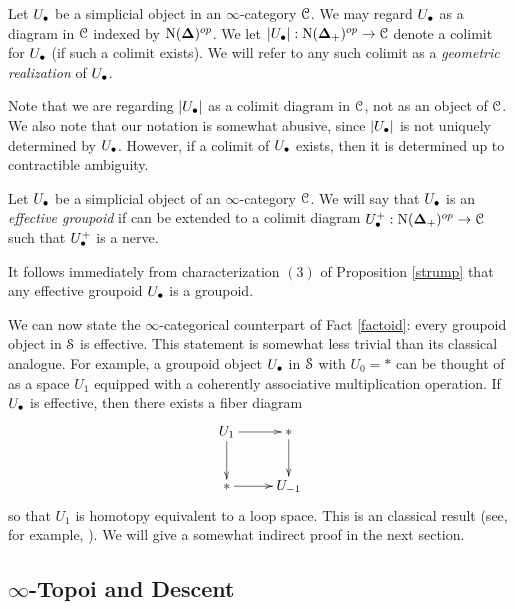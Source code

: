 \begin{notation}
Let $U_{\bullet}$ be a simplicial object in an $\infty$-category $\operatorname{\mathcal{C}}$. We may regard
$U_{\bullet}$ as a diagram in $\operatorname{\mathcal{C}}$ indexed
by $\operatorname{N}(\operatorname{{\bf \Delta}})^{op}$. We let $|U_{\bullet}|: \operatorname{N}(\operatorname{{\bf \Delta}}_{+})^{op} \rightarrow \operatorname{\mathcal{C}}$
denote a colimit for $U_{\bullet}$ (if such a colimit exists). We will refer to any such colimit as a {\it geometric realization} of $U_{\bullet}$. 
\end{notation}

\begin{remark}
Note that we are regarding $|U_{\bullet}|$ as a colimit diagram in $\operatorname{\mathcal{C}}$, not as an object of $\operatorname{\mathcal{C}}$. We also note that our notation is somewhat abusive, since $|U_{\bullet}|$ is not uniquely determined by $U_{\bullet}$. However, if a colimit of $U_{\bullet}$ exists, then it is determined up to contractible ambiguity.
\end{remark}

\begin{definition}
Let $U_{\bullet}$ be a simplicial object of an $\infty$-category $\operatorname{\mathcal{C}}$. We will say that
$U_{\bullet}$ is an {\it effective groupoid} if can be extended to a colimit diagram $U^{+}_{\bullet}: \operatorname{N}( \operatorname{{\bf \Delta}}_{+})^{op} \rightarrow \operatorname{\mathcal{C}}$ such that
$U^{+}_{\bullet}$ is a \Cech nerve.
\end{definition}

\begin{remark}
It follows immediately from characterization $(3)$ of Proposition \ref{strump} that any effective groupoid $U_{\bullet}$ is a groupoid.
\end{remark}

We can now state the $\infty$-categorical counterpart of Fact \ref{factoid}: every groupoid object in $\operatorname{\mathcal{S}}$ is effective. This statement is somewhat less trivial than its classical analogue. For example, a groupoid object $U_{\bullet}$ in $\operatorname{\mathcal{S}}$ with $U_0 = \ast$ can be thought of
as a space $U_{1}$ equipped with a coherently associative multiplication operation. If $U_{\bullet}$ is effective, then there exists a fiber diagram
$$ \xymatrix{ U_1 \ar[r] \ar[d] & \ast \ar[d] \\
\ast \ar[r] & U_{-1} }$$
so that $U_{1}$ is homotopy equivalent to a loop space.
This is an classical result (see, for example, \cite{stasheff}). We will give a somewhat indirect proof in the next section.

\subsection{$\infty$-Topoi and Descent}\label{magnet}

